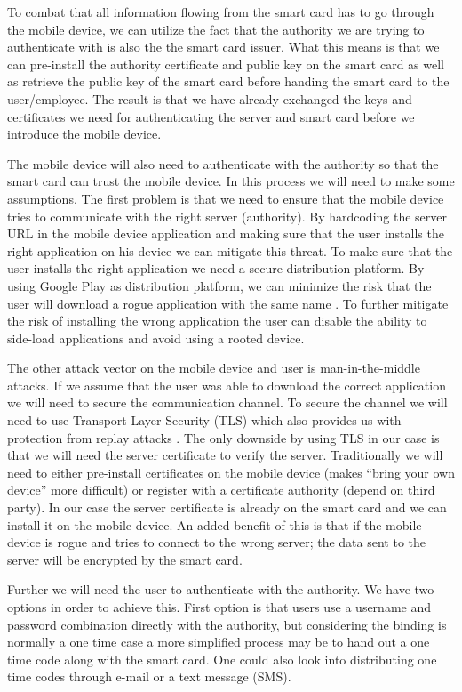 To combat that all information flowing from the smart card has to go through the mobile device, we can utilize the fact that the authority we are trying to authenticate with is also the the smart card issuer. What this means is that we can pre-install the authority certificate and public key on the smart card as well as retrieve the public key of the smart card before handing the smart card to the user/employee. The result is that we have already exchanged the keys and certificates we need for authenticating the server and smart card before we introduce the mobile device.

The mobile device will also need to authenticate with the authority so that the smart card can trust the mobile device. In this process we will need to make some assumptions. The first problem is that we need to  ensure that the mobile device tries to communicate with the right server (authority). By hardcoding the server URL in the mobile device application and making sure that the user installs the right application on his device we can mitigate this threat. To make sure that the user installs the right application we need a secure distribution platform. By using Google Play as distribution platform, we can minimize the risk that the user will download a rogue application with the same name \cite{googlePlaySecureDist}. To further mitigate the risk of installing the wrong application the user can disable the ability to side-load applications and avoid using a rooted device.

The other attack vector on the mobile device and user is man-in-the-middle attacks. If we assume that the user was able to download the correct application we will need to secure the communication channel. To secure the channel we will need to use Transport Layer Security (TLS) \cite{rfc793} which also provides us with protection from replay attacks \cite[~Ch. 9.2.2]{TLS101}. The only downside by using TLS in our case is that we will need the server certificate to verify the server. Traditionally we will need to either pre-install certificates on the mobile device (makes ``bring your own device'' more difficult) or register with a certificate authority (depend on third party). In our case the server certificate is already on the smart card and we can install it on the mobile device. An added benefit of this is that if the mobile device is rogue and tries to connect to the wrong server; the data sent to the server will be encrypted by the smart card.

Further we will need the user to authenticate with the authority. We have two options in order to achieve this. First option is that users use a username and password combination directly with the authority, but considering the binding is normally a one time case a more simplified process may be to hand out a one time code along with the smart card. One could also look into distributing one time codes through e-mail or a text message (SMS).

